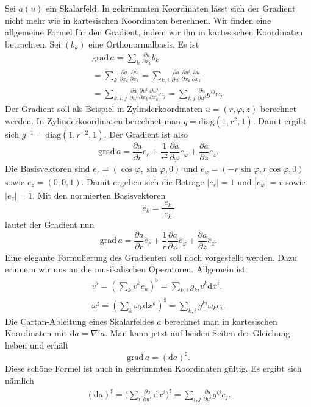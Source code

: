 \documentclass[a4paper,10pt,fleqn,twocolumn,twoside]{article}
\numberwithin{equation}{section}
\begin{document}
Sei $a(u)$ ein Skalarfeld. In gekrümmten Koordinaten lässt sich
der Gradient nicht mehr wie in kartesischen Koordinaten berechnen.
Wir finden eine allgemeine Formel für den Gradient, indem wir ihn in
kartesischen Koordinaten betrachten. Sei $(b_k)$ eine
Orthonormalbasis. Es ist
\begin{gather*}\mathrm{grad}\,a
= \sum_{k}\frac{\partial a}{\partial x_k}b_k\\
= \sum_{k}\frac{\partial a}{\partial x_k}\frac{\partial u}{\partial x_k}
= \sum_{k,i}\frac{\partial a}{\partial u^i}\frac{\partial u^i}{\partial x_k}
\frac{\partial u}{\partial x_k}\\
= \sum_{k,i,j}\frac{\partial a}{\partial u^i}\frac{\partial u^i}{\partial x_k}
\frac{\partial u^j}{\partial x_k}e_j
= \sum_{i,j}\frac{\partial a}{\partial u^i} g^{ij}e_j.
\end{gather*}
%
Der Gradient soll als Beispiel in Zylinderkoordinaten
$u=(r,\varphi,z)$ berechnet werden. In Zylinderkoordinaten
berechnet man $g = \mathrm{diag}(1,r^2,1)$. Damit ergibt sich
$g^{-1} = \mathrm{diag}(1,r^{-2},1)$. Der Gradient ist also
\begin{equation}
\mathrm{grad}\,a = \frac{\partial a}{\partial r} e_r
+\frac{1}{r^2}\frac{\partial a}{\partial \varphi} e_\varphi
+\frac{\partial a}{\partial z} e_z.
\end{equation}
Die Basisvektoren sind $e_r=(\cos\varphi,\sin\varphi,0)$
und $e_\varphi = (-r\sin\varphi,r\cos\varphi,0)$
sowie $e_z=(0,0,1)$. Damit ergeben sich die Beträge $|e_r|=1$
und $|e_\varphi|=r$ sowie $|e_z|=1$. Mit den normierten
Basisvektoren
\begin{equation}
\hat e_k = \frac{e_k}{|e_k|}
\end{equation}
lautet der Gradient nun
\begin{equation}
\mathrm{grad}\,a = \frac{\partial a}{\partial r} \hat e_r
+\frac{1}{r}\frac{\partial a}{\partial \varphi}\hat e_\varphi
+\frac{\partial a}{\partial z} \hat e_z.
\end{equation}
%
Eine elegante Formulierung des Gradienten soll noch vorgestellt
werden. Dazu erinnern wir uns an die musikalischen Operatoren.
Allgemein ist
\begin{gather*}
v^\flat = (\sum_k v^k e_k)^\flat
= \sum_{k,i} g_{ki}v^k\mathrm dx^i,\\
\omega^\sharp = (\sum_k \omega_k\mathrm dx^k)^\sharp
= \sum_{k,i} g^{ki}\omega_k\mathrm e_i.
\end{gather*}
Die Cartan-Ableitung eines Skalarfeldes $a$ berechnet man in
kartesischen Koordinaten mit
$\mathrm da = \nabla^\flat a$. 
Man kann jetzt auf beiden Seiten der Gleichung heben und erhält
\begin{equation}
\mathrm{grad}\,a = (\mathrm da)^\sharp.
\end{equation}
Diese schöne Formel ist auch in gekrümmten Koordinaten gültig.
Es ergibt sich nämlich
\begin{gather*}
(\mathrm da)^\sharp
= \Big(\sum_i \frac{\partial a}{\partial u^i}
\,\mathrm dx^i\Big)^\sharp
= \sum_{i,j} \frac{\partial a}{\partial u^i}g^{ij}e_j.
\end{gather*}
\end{document}
